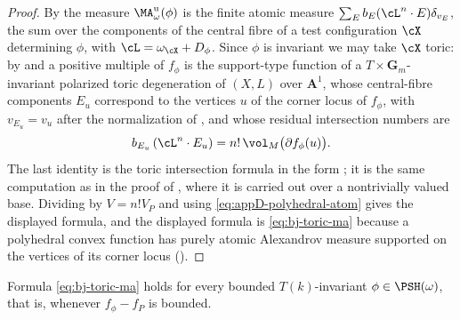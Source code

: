\begin{proof}
By  the measure $\MA^{\mathrm u}_\omega(\phi)$
is the finite atomic measure
$\sum_Eb_E(\cL^n\cdot E)\delta_{v_E}$, the sum over the components of the
central fibre of a test configuration $\cX$ determining $\phi$, with
$\cL=\omega_\cX+D_\phi$.  Since $\phi$ is invariant we may take $\cX$
toric: by  and
 a positive multiple of $f_\phi$ is
the support-type function of a $T\times\mathbf G_m$-invariant polarized
toric degeneration of $(X,L)$ over $\mathbf A^1$, whose central-fibre
components $E_u$ correspond to the vertices $u$ of the corner locus of
$f_\phi$, with $v_{E_u}=v_u$ after the normalization of
, and whose residual intersection
numbers are
\[
 b_{E_u}\,(\cL^n\cdot E_u)=n!\,\vol_M\bigl(\partial f_\phi(u)\bigr).
\]
The last identity is the toric intersection formula in the form
\cite[Theorem~13.4.3]{CLS11}; it is the same computation as in the proof of
, where it is carried out over a
nontrivially valued base.  Dividing by $V=n!V_P$ and using
\eqref{eq:appD-polyhedral-atom} gives the displayed formula, and the
displayed formula is \eqref{eq:bj-toric-ma} because a polyhedral convex
function has purely atomic Alexandrov measure supported on the vertices of
its corner locus ().
\end{proof}

\begin{proposition}
\label{prop:ch49-toric-ma-bounded}
Formula \eqref{eq:bj-toric-ma} holds for every bounded $T(k)$-invariant
$\phi\in\PSH(\omega)$, that is, whenever $f_\phi-f_P$ is bounded.
\end{proposition}

